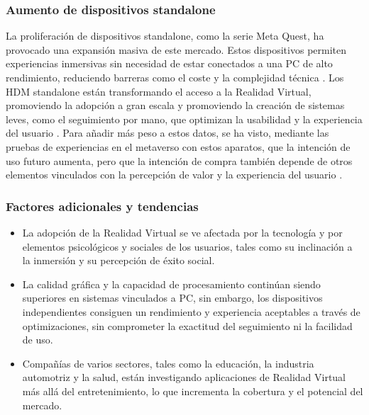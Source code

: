 \subsubsection{Aumento de dispositivos standalone}

La proliferación de dispositivos standalone, como la serie Meta Quest, ha provocado una expansión masiva de este mercado. Estos dispositivos permiten experiencias inmersivas sin necesidad de estar conectados a una PC de alto rendimiento, reduciendo barreras como el coste y la complejidad técnica \cite{Wohlgenannt2020Virtual}\cite{Cummings2022Psychological}\cite{Hennig-Thurau2024EXPRESS:}\cite{Rendevski2022PC}. Los HDM standalone están transformando el acceso a la Realidad Virtual, promoviendo la adopción a gran escala y promoviendo la creación de sistemas leves, como el seguimiento por mano, que optimizan la usabilidad y la experiencia del usuario \cite{Rendevski2022PC}. Para añadir más peso a estos datos, se ha visto, mediante las pruebas de experiencias en el metaverso con estos aparatos, que la intención de uso futuro aumenta, pero que la intención de compra también depende de otros elementos vinculados con la percepción de valor y la experiencia del usuario \cite{Hennig-Thurau2024EXPRESS:}.

\subsubsection{Factores adicionales y tendencias}

\begin{itemize}
	\item La adopción de la Realidad Virtual se ve afectada por la tecnología y por elementos psicológicos y sociales de los usuarios, tales como su inclinación a la inmersión y su percepción de éxito social. \cite{Cummings2022Psychological}
	\item La calidad gráfica y la capacidad de procesamiento continúan siendo superiores en sistemas vinculados a PC, sin embargo, los dispositivos independientes consiguen un rendimiento y experiencia aceptables a través de optimizaciones, sin comprometer la exactitud del seguimiento ni la facilidad de uso. \cite{Rendevski2022PC}
	\item Compañías de varios sectores, tales como la educación, la industria automotriz y la salud, están investigando aplicaciones de Realidad Virtual más allá del entretenimiento, lo que incrementa la cobertura y el potencial del mercado. \cite{Wohlgenannt2020Virtual} \cite{Wedel2020Virtual}
	
\end{itemize}


